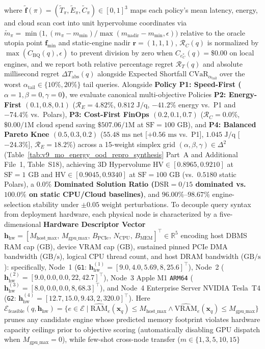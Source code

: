 \documentclass[10pt,a4paper]{article}
\begin{document}
where $\tilde{\mathbf{f}}(\pi) = (\tilde{T}_\pi, \tilde{E}_\pi, \tilde{C}_\pi) \in [0,1]^3$ maps each policy's mean latency, energy, and cloud scan cost into unit hypervolume coordinates via $\tilde{m}_\pi = \min\!\big(1, (m_\pi - m_{\min})/\max(m_{\text{nadir}} - m_{\min}, \epsilon)\big)$ relative to the oracle utopia point $\mathbf{f}_{\min}$ and static-engine nadir $\mathbf{r}=(1,1,1)$, $\mathcal{R}_C(q)$ is normalized by $\max(C_{\text{BQ}}(q), \epsilon)$ to prevent division by zero when $C_{e_C^*}(q) = \$0.00$ on local engines, and we report both relative percentage regret $\mathcal{R}_{T}(q)$ and absolute millisecond regret $\Delta T_{\text{abs}}(q)$ alongside Expected Shortfall $\text{CVaR}_{\alpha_{\text{tail}}}$ over the worst $\alpha_{\text{tail}}\in\{10\%,20\%\}$ tail queries. Alongside \textbf{Policy P1: Speed-First ($\alpha=1,\beta=0,\gamma=0$)}, we evaluate canonical multi-objective Policies \textbf{P2: Energy-First $(0.1,0.8,0.1)$} ($\mathcal{R}_E=4.82\%$, $0.812\text{ J/q}$, $-41.2\%$ energy vs.\ P1 and $-74.4\%$ vs.\ Polars), \textbf{P3: Cost-First FinOps $(0.2,0.1,0.7)$} ($\mathcal{R}_C=0.0\%$, $\$0.00/1\text{M}$ cloud spend saving $\$507.06/1\text{M}$ at $\text{SF}=100\text{ GB}$), and \textbf{P4: Balanced Pareto Knee $(0.5,0.3,0.2)$} ($55.48\text{ ms}$ net [$+0.56\text{ ms}$ vs.\ P1], $1.045\text{ J/q}$ [$-24.3\%$], $\mathcal{R}_E=18.2\%$) across a 15-weight simplex grid $(\alpha,\beta,\gamma)\in\Delta^2$ (Table~\ref{tab:v9_mo_energy_ood_repro_synthesis} Part~A and Additional File~1, Table~S18), achieving 3D Hypervolume $\text{HV}\in[0.8965,0.9210]$ at $\text{SF}=1\text{ GB}$ and $\text{HV}\in[0.9045,0.9340]$ at $\text{SF}=100\text{ GB}$ (vs.\ $0.5180$ static Polars), a $\mathbf{0.0\%}$ \textbf{Dominated Solution Ratio ($\text{DSR}=0/15$ dominated vs.\ $100.0\%$ on static CPU/Cloud baselines)}, and $\mathbf{96.00\%\text{--}98.67\%}$ engine-selection stability under $\pm 0.05$ weight perturbations. To decouple query syntax from deployment hardware, each physical node is characterized by a five-dimensional \textbf{Hardware Descriptor Vector} $\mathbf{h}_{\text{hw}} = [M_{\text{host\_max}},\, M_{\text{gpu\_max}},\, B_{\text{PCIe}},\, N_{\text{CPU}},\, B_{\text{MEM}}]^{\top} \in \mathbb{R}^{5}$ encoding host DBMS RAM cap ($\text{GB}$), device VRAM cap ($\text{GB}$), sustained pinned PCIe DMA bandwidth ($\text{GB/s}$), logical CPU thread count, and host DRAM bandwidth ($\text{GB/s}$): specifically, Node~1 (\texttt{G1}: $\mathbf{h}_{\text{hw}}^{(1)} = [9.0, 4.0, 5.69, 8, 25.6]^{\top}$), Node~2 ($\mathbf{h}_{\text{hw}}^{(2)} = [9.0, 0.0, 0.0, 22, 42.7]^{\top}$), Node~3 Apple M1 \texttt{ARM64} ($\mathbf{h}_{\text{hw}}^{(3)} = [8.0, 0.0, 0.0, 8, 68.3]^{\top}$), and Node~4 Enterprise Server NVIDIA Tesla~T4 (\texttt{G2}: $\mathbf{h}_{\text{hw}}^{(4)} = [12.7, 15.0, 9.43, 2, 320.0]^{\top}$). Here $\mathcal{E}_{\text{feasible}}(q, \mathbf{h}_{\text{hw}}) = \{e \in \mathcal{E} \mid \widehat{\text{RAM}}_e(\mathbf{x}_q) \le M_{\text{host\_max}} \land \widehat{\text{VRAM}}_e(\mathbf{x}_q) \le M_{\text{gpu\_max}}\}$ prunes any candidate engine whose predicted memory footprint violates hardware capacity ceilings prior to objective scoring (automatically disabling GPU dispatch when $M_{\text{gpu\_max}}=0$), while few-shot cross-node transfer ($m \in \{1,3,5,10,15\}$ 
\end{document}
